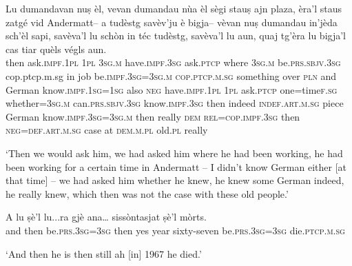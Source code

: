 \begin{linenumbers}
\gll Lu dumandavan nuṣ èl, vevan dumandau nùa èl sègi stauṣ ajn plaza, èra’l staus zatgé vid Andermatt– a tudèstg savèv’ju è bigja– vèvan nuṣ dumandau in'jèda sch’èl sapi, savèva’l lu schòn in téc tudèstg, savèva’l lu aun, quaj tg’èra lu bigja’l cas tiar quèls végls aun.   \\
then ask.\textsc{impf.1pl} \textsc{1pl} \textsc{3sg.m} have.\textsc{impf.3sg}  ask.\textsc{ptcp} where \textsc{3sg.m} be.\textsc{prs.sbjv.3sg} \textsf{cop.ptcp.m.sg} in job be.\textsc{impf.3sg=3sg.m}  \textsc{cop.ptcp.m.sg} something over \textsc{pln} and German know.\textsc{impf.1sg=1sg} also  \textsc{neg} have.\textsc{impf.1pl} \textsc{1pl} ask.\textsc{ptcp} one=time\textsc{f.sg} whether=\textsc{3sg.m} can.\textsc{prs.sbjv.3sg} know.\textsc{impf.3sg} then indeed \textsc{indef.art.m.sg} piece German know.\textsc{impf.3sg=3sg.m} then really \textsc{dem} \textsc{rel=cop.impf.3sg} then \textsc{neg=def.art.m.sg} case at \textsc{dem.m.pl} old.\textsc{pl} really \\
\end{linenumbers}
\medskip
\glt `Then we would ask him, we had asked him where he had been working, he had been working for a certain time in Andermatt – I didn’t know German either [at that time] – we had asked him whether he knew, he knew some German indeed, he really knew, which then was not the case with these old people.'
\medskip

\begin{linenumbers}
\gll  A lu ṣè’l lu...ra gjè ana… sissòntasjat ṣè’l mòrts. \\
and then be.\textsc{prs.3sg=3sg} then yes year sixty-seven be.\textsc{prs.3sg=3sg} die.\textsc{ptcp.m.sg} \\
\end{linenumbers}
\medskip
\glt `And then he is then still ah [in] 1967 he died.'
\medskip

